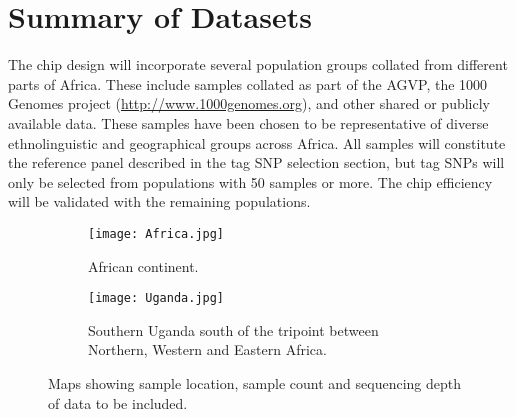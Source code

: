 \section{Summary of Datasets}
The chip design will incorporate several population groups collated from different parts of Africa. These include samples collated as part of the AGVP\cite{Gurdasani2014}, the 1000 Genomes project (\href{http://www.1000genomes.org}{http://www.1000genomes.org}),
 and other shared or publicly available data. These samples have been chosen to be representative of diverse ethnolinguistic and geographical groups across Africa. All samples will constitute the reference panel described in the tag SNP selection section, but tag SNPs will only be selected from populations with 50 samples or more. The chip efficiency will be validated with the remaining populations.

\begin{figure}[h]
\begin{subfigure}{.5\textwidth}
  \centering
  \texttt{[image: Africa.jpg]}
  \caption{African continent.}
\end{subfigure}%
\begin{subfigure}{.5\textwidth}
  \centering
  \texttt{[image: Uganda.jpg]}
  \caption{Southern Uganda south of the tripoint between Northern, Western and Eastern Africa.}
\end{subfigure}%
\caption{Maps showing sample location, sample count and sequencing depth of data to be included.}
\end{figure}

